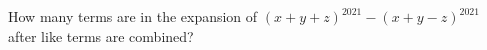 How many terms are in the expansion of $(x+y+z)^{2021}-(x+y-z)^{2021}$ after like terms are combined?
